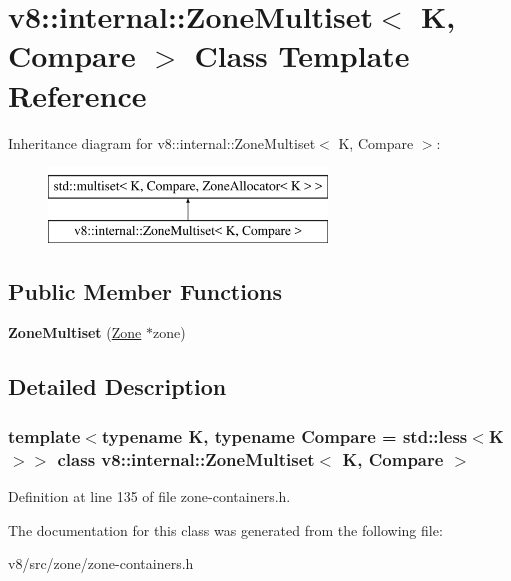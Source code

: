 \hypertarget{classv8_1_1internal_1_1ZoneMultiset}{}\section{v8\+:\+:internal\+:\+:Zone\+Multiset$<$ K, Compare $>$ Class Template Reference}
\label{classv8_1_1internal_1_1ZoneMultiset}
Inheritance diagram for v8\+:\+:internal\+:\+:Zone\+Multiset$<$ K, Compare $>$\+:\begin{figure}[H]
\begin{center}
\leavevmode
\includegraphics[height=2.000000cm]{classv8_1_1internal_1_1ZoneMultiset}
\end{center}
\end{figure}
\subsection*{Public Member Functions}
\begin{DoxyCompactItemize}
\item 
\mbox{\label{classv8_1_1internal_1_1ZoneMultiset_a7776ef5a5b88436b7b4492cf1e70bb65}} 
{\bfseries Zone\+Multiset} (\mbox{\hyperlink{classv8_1_1internal_1_1Zone}{Zone}} $\ast$zone)
\end{DoxyCompactItemize}


\subsection{Detailed Description}
\subsubsection*{template$<$typename K, typename Compare = std\+::less$<$\+K$>$$>$\newline
class v8\+::internal\+::\+Zone\+Multiset$<$ K, Compare $>$}



Definition at line 135 of file zone-\/containers.\+h.



The documentation for this class was generated from the following file\+:\begin{DoxyCompactItemize}
\item 
v8/src/zone/zone-\/containers.\+h\end{DoxyCompactItemize}
